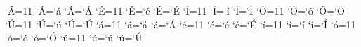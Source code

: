 %
%
% 
% 
%
%  
\catcode`^^c1=11 \lccode`^^c1=`^^e1 \uccode`^^c1=`^^c1    %
\catcode`^^c9=11 \lccode`^^c9=`^^e9 \uccode`^^c9=`^^c9    %
\catcode`^^cd=11 \lccode`^^cd=`^^ed \uccode`^^cd=`^^cd    %
\catcode`^^d3=11 \lccode`^^d3=`^^f3 \uccode`^^d3=`^^d3    %
\catcode`^^da=11 \lccode`^^da=`^^fa \uccode`^^da=`^^da    %
\catcode`^^e1=11 \lccode`^^e1=`^^e1 \uccode`^^e1=`^^c1    %
\catcode`^^e9=11 \lccode`^^e9=`^^e9 \uccode`^^e9=`^^c9    %
\catcode`^^ed=11 \lccode`^^ed=`^^ed \uccode`^^ed=`^^cd    %
\catcode`^^f3=11 \lccode`^^f3=`^^f3 \uccode`^^f3=`^^d3    %
\catcode`^^fa=11 \lccode`^^fa=`^^fa \uccode`^^fa=`^^da    %

